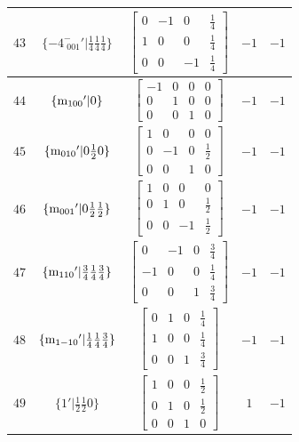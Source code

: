 \documentclass[fleqn,8pt]{jsarticle}
\begin{document}
\begin{longtable}{ccccc}
$ 43 $ & $ \{-4^{-}_{\,\,001}{}'|\frac{1}{4} \frac{1}{4} \frac{1}{4}\} $ & $ \begin{bmatrix} 0 & -1 & 0 & \frac{1}{4} \\ 1 & 0 & 0 & \frac{1}{4} \\ 0 & 0 & -1 & \frac{1}{4} \end{bmatrix} $ & $ -1 $ & $ -1 $ \\ \hline
$ 44 $ & $ \{{\rm m}_{100}{}'|0\} $ & $ \begin{bmatrix} -1 & 0 & 0 & 0 \\ 0 & 1 & 0 & 0 \\ 0 & 0 & 1 & 0 \end{bmatrix} $ & $ -1 $ & $ -1 $ \\ \hline
$ 45 $ & $ \{{\rm m}_{010}{}'|0 \frac{1}{2} 0\} $ & $ \begin{bmatrix} 1 & 0 & 0 & 0 \\ 0 & -1 & 0 & \frac{1}{2} \\ 0 & 0 & 1 & 0 \end{bmatrix} $ & $ -1 $ & $ -1 $ \\ \hline
$ 46 $ & $ \{{\rm m}_{001}{}'|0 \frac{1}{2} \frac{1}{2}\} $ & $ \begin{bmatrix} 1 & 0 & 0 & 0 \\ 0 & 1 & 0 & \frac{1}{2} \\ 0 & 0 & -1 & \frac{1}{2} \end{bmatrix} $ & $ -1 $ & $ -1 $ \\ \hline
$ 47 $ & $ \{{\rm m}_{110}{}'|\frac{3}{4} \frac{1}{4} \frac{3}{4}\} $ & $ \begin{bmatrix} 0 & -1 & 0 & \frac{3}{4} \\ -1 & 0 & 0 & \frac{1}{4} \\ 0 & 0 & 1 & \frac{3}{4} \end{bmatrix} $ & $ -1 $ & $ -1 $ \\ \hline
$ 48 $ & $ \{{\rm m}_{1-10}{}'|\frac{1}{4} \frac{1}{4} \frac{3}{4}\} $ & $ \begin{bmatrix} 0 & 1 & 0 & \frac{1}{4} \\ 1 & 0 & 0 & \frac{1}{4} \\ 0 & 0 & 1 & \frac{3}{4} \end{bmatrix} $ & $ -1 $ & $ -1 $ \\ \hline
$ 49 $ & $ \{1{}'|\frac{1}{2} \frac{1}{2} 0\} $ & $ \begin{bmatrix} 1 & 0 & 0 & \frac{1}{2} \\ 0 & 1 & 0 & \frac{1}{2} \\ 0 & 0 & 1 & 0 \end{bmatrix} $ & $ 1 $ & $ -1 $ \\ \hline

\end{longtable}
\end{document}
